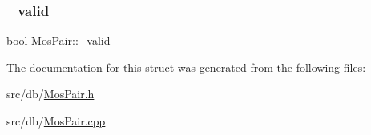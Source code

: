 \subsubsection{\texorpdfstring{\+\_\+valid}{\_valid}}
{\footnotesize\ttfamily bool Mos\+Pair\+::\+\_\+valid\hspace{0.3cm}{\ttfamily [private]}}



The documentation for this struct was generated from the following files\+:\begin{DoxyCompactItemize}
\item 
src/db/\hyperlink{MosPair_8h}{Mos\+Pair.\+h}\item 
src/db/\hyperlink{MosPair_8cpp}{Mos\+Pair.\+cpp}\end{DoxyCompactItemize}
